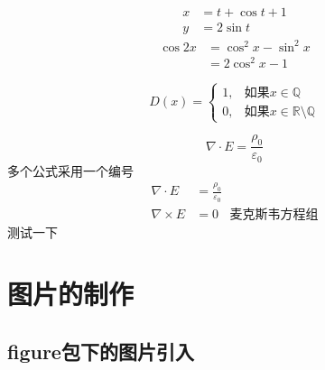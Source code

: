 \documentclass[UTF8,twocolumn, a4paper]{ctexart}
\begin{document}
        \begin{align}
            x &= t + \cos t + 1\\
            y &= 2\sin t
        \end{align}
        \begin{equation}
            \begin{split}
            \cos 2x &= \cos^2 x - \sin^2 x\\
            &= 2\cos^2 x - 1
            \end{split}
        \end{equation}
         
         
        \begin{equation}
            D(x) = \begin{cases}
            1, &\text{如果} x \in \mathbb{Q}\\%
            0, &\text{如果} x \in \mathbb{R}\setminus\mathbb{Q}	
                   \end{cases}%
        \end{equation}
         

        \begin{equation}%
            \nabla \cdot E =\frac{\rho_0}{\varepsilon_0}
        \end{equation}
        多个公式采用一个编号
        \begin{equation}
            \begin{split}
                \nabla \cdot E &=\frac{\rho_0}{\varepsilon_0}\\
                \nabla \times E&=0  ~~~~    \text{麦克斯韦方程组}
            \end{split}
        \end{equation}
        测试一下

    \section{图片的制作}
    \subsection{figure包下的图片引入}
\end{document}
